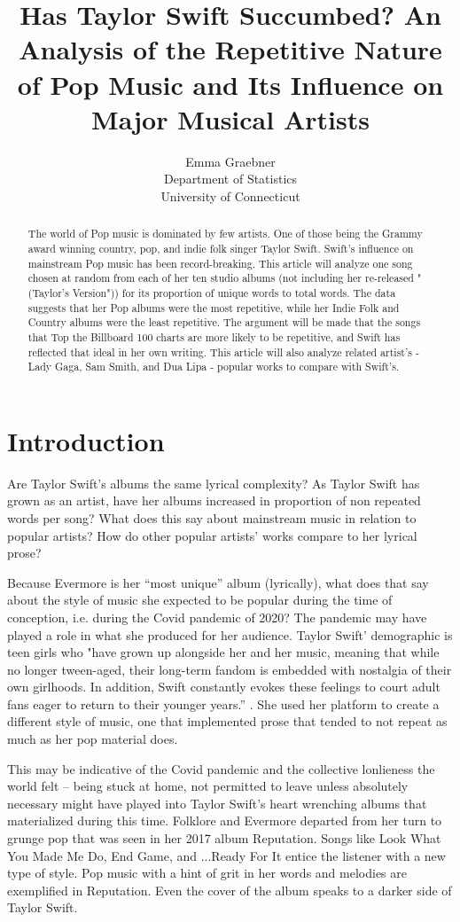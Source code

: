 \documentclass[12pt]{article}
\title{Has Taylor Swift Succumbed? An Analysis of the Repetitive Nature of Pop Music and Its Influence on Major Musical Artists}
\author{Emma Graebner\\
  Department of Statistics\\
  University of Connecticut
}
\begin{document}
\maketitle

\begin{abstract}
The world of Pop music is dominated by few artists. One of those being the Grammy award winning country, pop, and indie folk singer Taylor Swift. Swift's influence on mainstream Pop music has been record-breaking. This article will analyze one song chosen at random from each of her ten studio albums (not including her re-released "(Taylor's Version")) for its proportion of unique words to total words. The data suggests that her Pop albums were the most repetitive, while her Indie Folk and Country albums were the least repetitive. The argument will be made that the songs that Top the Billboard 100 charts are more likely to be repetitive, and Swift has reflected that ideal in her own writing. This article will also analyze related artist's - Lady Gaga, Sam Smith, and Dua Lipa - popular works to compare with Swift's.   
\end{abstract}


\section{Introduction}
\label{sec:intro}

Are Taylor Swift’s albums the same lyrical complexity? As Taylor Swift has grown as an artist, have her albums increased in proportion of non repeated words per song? What does this say about mainstream music in relation to popular artists? How do other popular artists’ works compare to her lyrical prose? 

	Because Evermore is her “most unique” album (lyrically), what does that say about the style of music she expected to be popular during the time of conception, i.e. during the Covid pandemic of 2020? The pandemic may have played a role in what she produced for her audience. Taylor Swift' demographic is teen girls who "have grown up alongside her and her music, meaning that while no longer tween-aged, their long-term fandom is embedded with nostalgia of their own girlhoods. In addition, Swift constantly evokes these feelings to court adult fans eager to return to their younger years.” \citep{rossman2022taylor}. She used her platform to create a different style of music, one that implemented prose that tended to not repeat as much as her pop material does.
	
	This may be indicative of the Covid pandemic and the collective lonlieness the world felt -- being stuck at home, not permitted to leave unless absolutely necessary might have played into Taylor Swift's heart wrenching albums that materialized during this time. Folklore and Evermore departed from her turn to grunge pop that was seen in her 2017 album Reputation. Songs like Look What You Made Me Do, End Game, and ...Ready For It entice the listener with a new type of style. Pop music with a hint of grit in her words and melodies are exemplified in Reputation. Even the cover of the album speaks to a darker side of Taylor Swift. 
\end{document}
